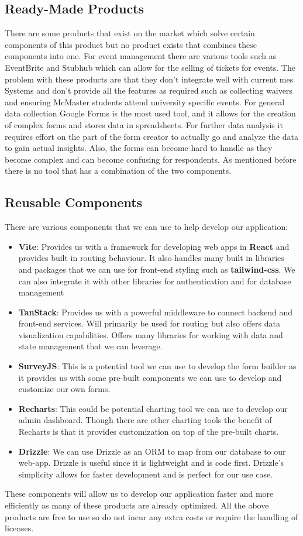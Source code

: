 \documentclass[12pt]{article}
\begin{document}
\subsection{Ready-Made Products}
There are some products that exist on the market which solve certain components of this product but no product exists
that combines these components into one. For event management there are various tools such as EventBrite and Stubhub
which can allow for the selling of tickets for events. The problem with these products are that they don't integrate
well with current \gls{mes} Systems and don't provide all the features as required such as collecting waivers and
ensuring McMaster students attend university specific events. For general data collection Google Forms is the most used
tool, and it allows for the creation of complex forms and stores data in spreadsheets. For further data analysis it
requires effort on the part of the form creator to actually go and analyze the data to gain actual insights. Also, the
forms can become hard to handle as they become complex and can become confusing for respondents. As mentioned before
there is no tool that has a combination of the two components.
\subsection{Reusable Components}
There are various components that we can use to help develop our application:
\begin{itemize}
  \item \textbf{Vite}: Provides us with a framework for developing web apps in \textbf{React} and provides built in
    routing behaviour. It also handles many built in libraries and packages that we can use for front-end styling such
    as \textbf{tailwind-css}. We can also integrate it with other libraries for authentication and for database
    management
  \item \textbf{TanStack}: Provides us with a powerful middleware to connect backend and front-end services. Will
    primarily be used for routing but also offers data visualization capabilities. Offers many libraries for working
    with data and state management that we can leverage.
  \item \textbf{SurveyJS}: This is a potential tool we can use to develop the form builder as it provides us with some
    pre-built components we can use to develop and customize our own forms.
  \item \textbf{Recharts}: This could be potential charting tool we can use to develop our admin dashboard. Though there
    are other charting tools the benefit of Recharts is that it provides customization on top of the pre-built charts.
  \item \textbf{Drizzle}: We can use Drizzle as an ORM to map from our database to our web-app. Drizzle is useful since
    it is lightweight and is code first. Drizzle's simplicity allows for faster development and is perfect for our use
    case.
\end{itemize}
These components will allow us to develop our application faster and more efficiently as many of these products are
already optimized. All the above products are free to use so do not incur any extra costs or require the handling of
licenses.
\end{document}
